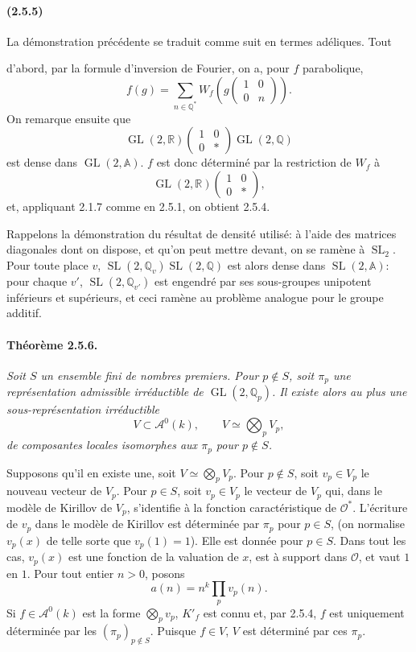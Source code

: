 \documentclass[10pt,a4paper]{article}
\providecommand{\GL}{\operatorname{GL}}
\providecommand{\SL}{\operatorname{SL}}
\providecommand{\R}{\mathbb R}
\providecommand{\Q}{\mathbb Q}
\providecommand{\A}{\mathbb A}
\providecommand{\OO}{\mathcal O}
\begin{document}
\paragraph{(2.5.5)} La démonstration précédente se traduit comme suit en termes adéliques. Tout

\clearpage
{}
\hypertarget{authority-36}{}
d'abord, par la formule d'inversion de Fourier, on a, pour \(f\) parabolique,
\[
\tag{2.5.5.1}
f(g)=\sum_{n\in\Q^*}W_f\!\left(g\begin{pmatrix}1&0\\0&n\end{pmatrix}\right).
\]
On remarque ensuite que
\[
\GL(2,\R)\begin{pmatrix}1&0\\0&*\end{pmatrix}\GL(2,\Q)
\]
est dense dans \(\GL(2,\A)\). \(f\) est donc déterminé par la restriction de \(W_f\) à
\[
\GL(2,\R)\begin{pmatrix}1&0\\0&*\end{pmatrix},
\]
et, appliquant 2.1.7 comme en 2.5.1, on obtient 2.5.4.

Rappelons la démonstration du résultat de densité utilisé: à l'aide des matrices diagonales dont on dispose, et qu'on peut mettre devant, on se ramène à \(\SL_2\). Pour toute place \(v\), \(\SL(2,\Q_v)\SL(2,\Q)\) est alors dense dans \(\SL(2,\A)\): pour chaque \(v'\), \(\SL(2,\Q_{v'})\) est engendré par ses sous-groupes unipotent inférieurs et supérieurs, et ceci ramène au problème analogue pour le groupe additif.

\paragraph{Théorème 2.5.6.}{\itshape  Soit \(S\) un ensemble fini de nombres premiers. Pour \(p\notin S\), soit \(\pi_p\) une représentation admissible irréductible de \(\GL(2,\Q_p)\). Il existe alors au plus une sous-représentation irréductible
\[
V\subset \mathcal A^0(k),\qquad V\simeq\bigotimes_p V_p,
\]
de composantes locales isomorphes aux \(\pi_p\) pour \(p\notin S\).\par}

Supposons qu'il en existe une, soit \(V\simeq\bigotimes_pV_p\). Pour \(p\notin S\), soit \(v_p\in V_p\) le nouveau vecteur de \(V_p\). Pour \(p\in S\), soit \(v_p\in V_p\) le vecteur de \(V_p\) qui, dans le modèle de Kirillov de \(V_p\), s'identifie à la fonction caractéristique de \(\OO^*\). L'écriture de \(v_p\) dans le modèle de Kirillov est déterminée par \(\pi_p\) pour \(p\in S\), (on normalise \(v_p(x)\) de telle sorte que \(v_p(1)=1\)). Elle est donnée pour \(p\in S\). Dans tout les cas, \(v_p(x)\) est une fonction de la valuation de \(x\), est à support dans \(\OO\), et vaut \(1\) en \(1\). Pour tout entier \(n>0\), posons
\[
a(n)=n^k\prod_p v_p(n).
\]
Si \(f\in \mathcal A^0(k)\) est la forme \(\bigotimes_p v_p\), \(K'_f\) est connu et, par 2.5.4, \(f\) est uniquement déterminée par les \((\pi_p)_{p\notin S}\). Puisque \(f\in V\), \(V\) est déterminé par ces \(\pi_p\).
\end{document}
